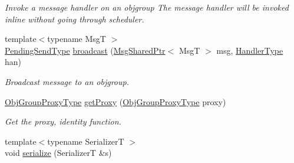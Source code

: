\begin{DoxyCompactItemize}
\begin{DoxyCompactList}\small\item\em Invoke a message handler on an objgroup The message handler will be invoked inline without going through scheduler. \end{DoxyCompactList}\item 
{\footnotesize template$<$typename MsgT $>$ }\\\hyperlink{structvt_1_1objgroup_1_1_obj_group_manager_a4f82f640edf670ba5a282074e5710921}{Pending\+Send\+Type} \hyperlink{structvt_1_1objgroup_1_1_obj_group_manager_a5ffd2a0884bc9ca6899e0b21bc86172a}{broadcast} (\hyperlink{namespacevt_ab2b3d506ec8e8d1540aede826d84a239}{Msg\+Shared\+Ptr}$<$ MsgT $>$ msg, \hyperlink{namespacevt_af64846b57dfcaf104da3ef6967917573}{Handler\+Type} han)
\begin{DoxyCompactList}\small\item\em Broadcast message to an objgroup. \end{DoxyCompactList}\item 
\hyperlink{namespacevt_ad7cae989df485fccca57f0792a880a8e}{Obj\+Group\+Proxy\+Type} \hyperlink{structvt_1_1objgroup_1_1_obj_group_manager_a9569c5ad1c032a90573bd987c64f560a}{get\+Proxy} (\hyperlink{namespacevt_ad7cae989df485fccca57f0792a880a8e}{Obj\+Group\+Proxy\+Type} proxy)
\begin{DoxyCompactList}\small\item\em Get the proxy, identity function. \end{DoxyCompactList}\item 
{\footnotesize template$<$typename SerializerT $>$ }\\void \hyperlink{structvt_1_1objgroup_1_1_obj_group_manager_a218394ac115ac9f61d8858b54e06520a}{serialize} (SerializerT \&s)
\end{DoxyCompactItemize}
